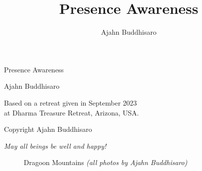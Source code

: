 \documentclass[12pt,openany]{book}
\title{Presence Awareness}
\author{Ajahn Buddhisaro}
\date{}
\begin{document}
\frontmatter
\pagestyle{empty}

\begin{center}\end{center}

\vspace{4em}

\begin{center}
{\huge Presence Awareness}

\vspace{4em}

{\Large Ajahn Buddhisaro}
\end{center}

\vspace{16em}
{\small
\noindent Based on a retreat given in September 2023 \\at Dhar\-ma Treasure Retreat, Arizona, USA.

\bigskip

\noindent Copyright Ajahn Buddhisaro
}

\begin{center}
\textit{May all beings be well and happy!}
\end{center}

\vfill

\newpage

\tableofcontents

\mainmatter
\raggedbottom

\begin{center}\end{center}
\vspace{4em}

\begin{figure}[h]
    \centering
    \caption*{Dragoon Mountains \textit{(all photos by Ajahn Buddhisaro)}}
\end{figure}
\end{document}
